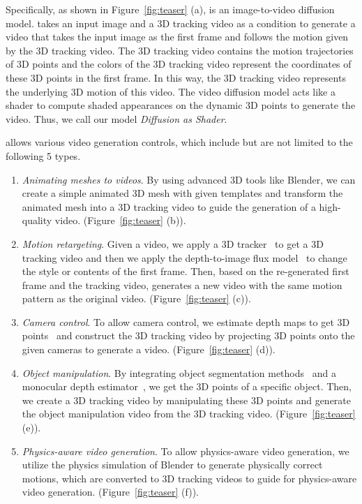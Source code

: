 Specifically, as shown in Figure~\ref{fig:teaser} (a), \methodname is an image-to-video diffusion model. \methodname takes an input image and a 3D tracking video as a condition to generate a video that takes the input image as the first frame and follows the motion given by the 3D tracking video. The 3D tracking video contains the motion trajectories of 3D points and the colors of the 3D tracking video represent the coordinates of these 3D points in the first frame. In this way, the 3D tracking video represents the underlying 3D motion of this video. The video diffusion model acts like a shader to compute shaded appearances on the dynamic 3D points to generate the video. Thus, we call our model \textit{Diffusion as Shader}.

\methodname allows various video generation controls, which include but are not limited to the following 5 types.
\begin{enumerate}
    \item \textit{Animating meshes to videos}. By using advanced 3D tools like Blender, we can create a simple animated 3D mesh with given templates and transform the animated mesh into a 3D tracking video to guide the generation of a high-quality video. (Figure~\ref{fig:teaser} (b)).
    \item \textit{Motion retargeting}. Given a video, we apply a 3D tracker~\cite{xiao2024spatialtracker} to get a 3D tracking video and then we apply the depth-to-image flux model~\cite{flux} to change the style or contents of the first frame. Then, based on the re-generated first frame and the tracking video, \methodname generates a new video with the same motion pattern as the original video. (Figure~\ref{fig:teaser} (c)).
    \item \textit{Camera control}. To allow camera control, we estimate depth maps to get 3D points~\cite{bochkovskii2024depth} and construct the 3D tracking video by projecting 3D points onto the given cameras to generate a video. (Figure~\ref{fig:teaser} (d)).
    \item \textit{Object manipulation}. By integrating object segmentation methods~\cite{kirillov2023segment} and a monocular depth estimator~\cite{bochkovskii2024depth}, we get the 3D points of a specific object. Then, we create a 3D tracking video by manipulating these 3D points and generate the object manipulation video from the 3D tracking video. (Figure~\ref{fig:teaser} (e)).
    \item \textit{Physics-aware video generation}. To allow physics-aware video generation, we utilize the physics simulation of Blender to generate physically correct motions, which are converted to 3D tracking videos to guide \methodname for physics-aware video generation. (Figure~\ref{fig:teaser} (f)).
\end{enumerate}

